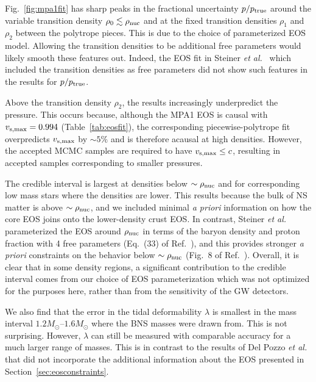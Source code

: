 \documentclass[twocolumn,prd,amssymb,aps,nofootinbib,showpacs,epsf]{revtex4}
\begin{document}
Fig.~\ref{fig:mpa1fit} has sharp peaks in the fractional uncertainty $p/p_{\rm true}$ around the variable transition density $\rho_0 \lesssim \rho_{\rm nuc}$ and at the fixed transition densities $\rho_1$ and $\rho_2$ between the polytrope pieces. This is due to the choice of parameterized EOS model. Allowing the transition densities to be additional free parameters would likely smooth these features out. Indeed, the EOS fit in Steiner {\it et al.}~\cite{SteinerLattimerBrown2010} which included the transition densities as free parameters did not show such features in the results for $p/p_{\rm true}$. 

Above the transition density $\rho_2$, the results increasingly underpredict the pressure. This occurs because, although the MPA1 EOS is causal with $v_{\rm s,max}=0.994$ (Table~\ref{tab:eosfit}), the corresponding piecewise-polytrope fit overpredicts $v_{\rm s,max}$ by $\sim 5\%$ and is therefore acausal at high densities. However, the accepted MCMC samples are required to have $v_{\rm s,max} \leq c$, resulting in accepted samples corresponding to smaller pressures. 

The credible interval is largest at densities below $\sim \rho_{\rm nuc}$ and for corresponding low mass stars where the densities are lower. This results because the bulk of NS matter is above $\sim \rho_{\rm nuc}$, and we included minimal {\it a priori} information on how the core EOS joins onto the lower-density crust EOS. In contrast, Steiner {\it et al.}~\cite{SteinerLattimerBrown2010} parameterized the EOS around $\rho_{\rm nuc}$ in terms of the baryon density and proton fraction with 4 free parameters (Eq.~(33) of Ref.~\cite{SteinerLattimerBrown2010}), and this provides stronger {\it a priori} constraints on the behavior below $\sim \rho_{\rm nuc}$ (Fig.~8 of Ref.~\cite{SteinerLattimerBrown2010}). Overall, it is clear that in some density regions, a significant contribution to the credible interval comes from our choice of EOS parameterization which was not optimized for the purposes here, rather than from the sensitivity of the GW detectors. 

We also find that the error in the tidal deformability $\lambda$ is smallest in the mass interval $1.2M_\odot$--$1.6M_\odot$ where the BNS masses were drawn from. This is not surprising. However, $\lambda$ can still be measured with comparable accuracy for a much larger range of masses. This is in contrast to the results of Del Pozzo {\it et al.}~\cite{DelPozzoLiAgathos2013} that did not incorporate the additional information about the EOS presented in Section~\ref{sec:eosconstraints}.
\end{document}
